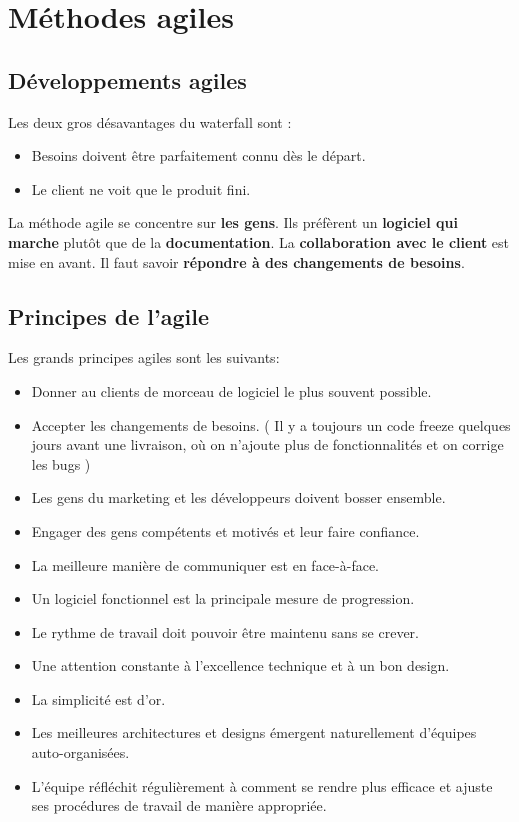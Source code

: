 \section{Méthodes agiles}


\subsection{Développements agiles}
Les deux gros désavantages du waterfall sont :
\begin{itemize}
    \item Besoins doivent être parfaitement connu dès le départ.
    \item Le client ne voit que le produit fini.
\end{itemize}
La méthode agile se concentre sur \textbf{les gens}. Ils préfèrent un \textbf{logiciel qui marche} plutôt que de la \textbf{documentation}. La \textbf{collaboration avec le client} est mise en avant. Il faut savoir \textbf{répondre à des changements de besoins}.



\subsection{Principes de l'agile}
Les grands principes agiles sont les suivants:
\begin{itemize}
	\item Donner au clients de morceau de logiciel le plus souvent possible.
	\item Accepter les changements de besoins. ( Il y a toujours un code freeze quelques jours avant une livraison, où on n’ajoute plus de fonctionnalités et on corrige les bugs )
	\item Les gens du marketing et les développeurs doivent bosser ensemble.
	\item Engager des gens compétents et motivés et leur faire confiance.
	\item La meilleure manière de communiquer est en face-à-face.
	\item Un logiciel fonctionnel est la principale mesure de progression.
	\item Le rythme de travail doit pouvoir être maintenu sans se crever.
	\item Une attention constante à l’excellence technique et à un bon design.
	\item La simplicité est d’or.
	\item Les meilleures architectures et designs émergent naturellement d’équipes auto-organisées.
	\item L’équipe réfléchit régulièrement à comment se rendre plus efficace et ajuste ses procédures de travail de manière appropriée.
\end{itemize}



